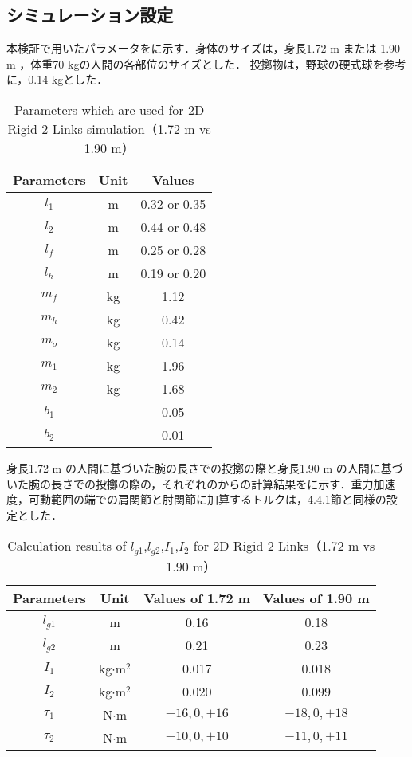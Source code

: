 \subsection{シミュレーション設定}
本検証で用いたパラメータをに示す．身体のサイズは，身長1.72 m または 1.90 m ，体重70 kgの人間の各部位のサイズとした．
投擲物は，野球の硬式球を参考に，0.14 kgとした．
\begin{table}[tb]
  \begin{center}
    \caption{Parameters which are used for 2D Rigid 2 Links simulation（1.72 m vs 1.90 m）}
    \begin{tabular}{c|c|c}
      \hline
      Parameters & Unit & Values \\
      \hline
      $l_{1}$ & m & 0.32 or 0.35 \\
      $l_{2}$ & m & 0.44 or 0.48 \\
      $l_{f}$ & m & 0.25 or 0.28 \\
      $l_{h}$ & m & 0.19 or 0.20 \\
      $m_{f}$ & kg & 1.12 \\
      $m_{h}$ & kg & 0.42 \\
      $m_{o}$ & kg & 0.14 \\
      $m_{1}$ & kg & 1.96 \\
      $m_{2}$ & kg & 1.68 \\
      $b_{1}$ &  & 0.05 \\
      $b_{2}$ &  & 0.01 \\
      \hline
    \end{tabular}
  \end{center}
\end{table}


身長1.72 m の人間に基づいた腕の長さでの投擲の際と身長1.90 m の人間に基づいた腕の長さでの投擲の際の，それぞれのからの計算結果をに示す．重力加速度，可動範囲の端での肩関節と肘関節に加算するトルクは，4.4.1節と同様の設定とした．

\begin{table}[tb]
  \begin{center}
    \caption{Calculation results of $l_{g1}$,$l_{g2}$,$I_{1}$,$I_{2}$ for 2D Rigid 2 Links（1.72 m vs 1.90 m）}
    \begin{tabular}{c|c|c|c}
      \hline
      Parameters & Unit & Values of 1.72 m & Values of 1.90 m \\
      \hline
      $l_{g1}$ & m & 0.16 & 0.18 \\
      $l_{g2}$ & m & 0.21 & 0.23 \\
      $I_{1}$ & kg$\cdot$$\mathrm{m}^2$ & 0.017 & 0.018 \\
      $I_{2}$ & kg$\cdot$$\mathrm{m}^2$ & 0.020 & 0.099 \\
      $\tau_{1}$ & N$\cdot$m & $-16, 0, +16$ & $-18, 0, +18$ \\
      $\tau_{2}$ & N$\cdot$m & $-10, 0, +10$ & $-11, 0, +11$ \\
      \hline
    \end{tabular}
  \end{center}
\end{table}

